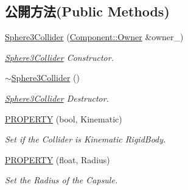 \subsection*{公開方法(Public Methods)}
\begin{DoxyCompactItemize}
\item 
\hyperlink{class_i_dream_sky_1_1_sphere3_collider_aa5b5b4e6547a691989d24cccda5f1b7b}{Sphere3\+Collider} (\hyperlink{class_i_dream_sky_1_1_component_1_1_owner}{Component\+::\+Owner} \&owner\+\_\+)
\begin{DoxyCompactList}\small\item\em \hyperlink{class_i_dream_sky_1_1_sphere3_collider}{Sphere3\+Collider} Constructor. \end{DoxyCompactList}\item 
\hyperlink{class_i_dream_sky_1_1_sphere3_collider_aa1ccc4438ea09b9bae39712f7e967452}{$\sim$\+Sphere3\+Collider} ()
\begin{DoxyCompactList}\small\item\em \hyperlink{class_i_dream_sky_1_1_sphere3_collider}{Sphere3\+Collider} Destructor. \end{DoxyCompactList}\item 
\hyperlink{class_i_dream_sky_1_1_sphere3_collider_a0b1d12aaa4f2cc0f479a118f26dcee90}{P\+R\+O\+P\+E\+R\+TY} (bool, Kinematic)
\begin{DoxyCompactList}\small\item\em Set if the Collider is Kinematic Rigid\+Body. \end{DoxyCompactList}\item 
\hyperlink{class_i_dream_sky_1_1_sphere3_collider_a821e40733fa5d242c69f20deee57c2e6}{P\+R\+O\+P\+E\+R\+TY} (float, Radius)
\begin{DoxyCompactList}\small\item\em Set the Radius of the Capsule. \end{DoxyCompactList}\end{DoxyCompactItemize}
